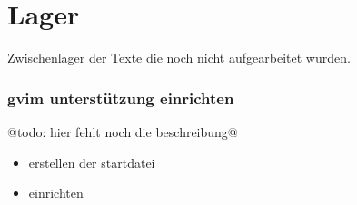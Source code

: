
\chapter{Lager}

Zwischenlager der Texte die noch nicht aufgearbeitet wurden.

\subsection{gvim unterstützung einrichten}
\label{ssec:gvim-unterstuxfctzung-einrichten}

@todo: hier fehlt noch die beschreibung@

\begin{itemize}
\itemsep1pt\parskip0pt
\item
  erstellen der startdatei
\item
  einrichten
\end{itemize}



